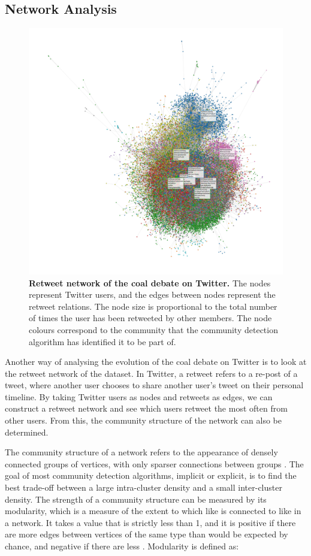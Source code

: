 \documentclass[12pt,onecolumn,twoside]{layout}
\begin{document}
\subsection*{Network Analysis}
\begin{figure} 
	\begin{center}
		\includegraphics[width=0.8\linewidth]{figures/rt_network_ht2}
	\end{center}
	\caption{\textbf{Retweet network of the coal debate on Twitter.} The nodes represent Twitter users, and the edges between nodes represent the retweet relations. The node size is proportional to the total number of times the user has been retweeted by other members. The node colours correspond to the community that the community detection algorithm has identified it to be part of.}
	\label{fig:rt_network}
\end{figure}	


Another way of analysing the evolution of the coal debate on Twitter is to look at the retweet network of the dataset. In Twitter, a retweet refers to a re-post of a tweet, where another user chooses to share another user's tweet on their personal timeline. By taking Twitter users as nodes and retweets as edges, we can construct a retweet network and see which users retweet the most often from other users. From this, the community structure of the network can also be determined. 

The community structure of a network refers to the appearance of densely connected groups of vertices, with only sparser connections between groups \cite{Newman8577}. The goal of most community detection algorithms, implicit or explicit, is to find the best trade-off between a large intra-cluster density and a small inter-cluster density. The strength of a community structure can be measured by its modularity, which is a measure of the extent to which like is connected to like in a network. It takes a value that is strictly less than 1, and it is positive if there are more edges between vertices of the same type than would be expected by chance, and negative if there are less \cite{Newman8577}. Modularity is defined as: 
\end{document}
